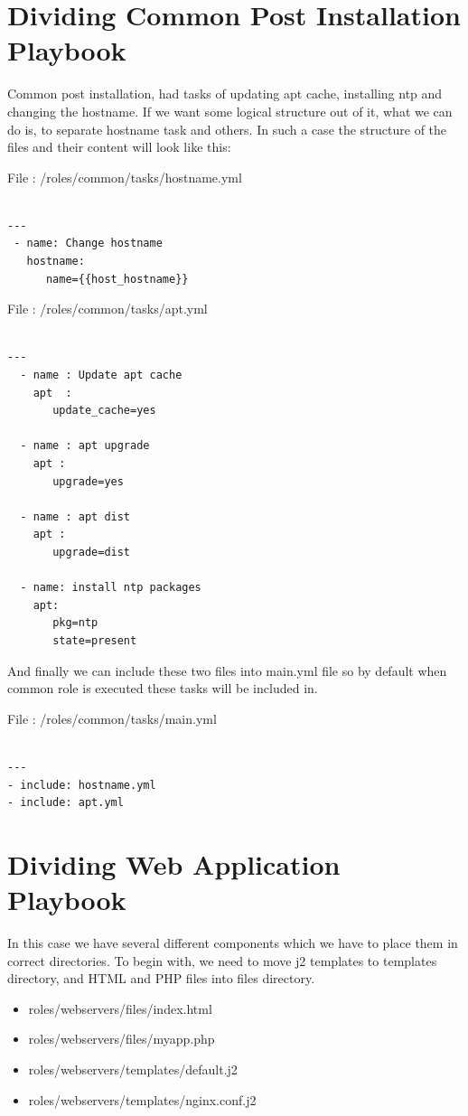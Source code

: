 \documentclass[10pt]{book}
\begin{document}
\section{Dividing Common Post Installation Playbook}
 Common post installation, had tasks of updating apt cache, installing ntp and 
 changing the hostname. If we want some logical structure out of it, what we can 
 do is, to separate hostname task and others. In such a case the structure of 
 the files and their content will look like this:
 
File : /roles/common/tasks/hostname.yml
\begin{Verbatim} 
 
---
 - name: Change hostname
   hostname: 
      name={{host_hostname}}

\end{Verbatim}


File : /roles/common/tasks/apt.yml
\begin{Verbatim} 
 
---
  - name : Update apt cache
    apt  : 
       update_cache=yes

  - name : apt upgrade
    apt : 
       upgrade=yes

  - name : apt dist
    apt : 
       upgrade=dist

  - name: install ntp packages
    apt:
       pkg=ntp 
       state=present

\end{Verbatim}  

And finally we can include these two files into main.yml file so by default when 
common role is executed these tasks will be included in.

File : /roles/common/tasks/main.yml
\begin{Verbatim} 
 
---
- include: hostname.yml
- include: apt.yml

\end{Verbatim}  


\section{Dividing Web Application Playbook}
In this case we have several different components which we have to place them in 
correct directories. To begin with, we need to move j2 templates to templates 
directory, and HTML and PHP files into files directory.

\begin{itemize}
\item roles/webservers/files/index.html
\item roles/webservers/files/myapp.php
\item roles/webservers/templates/default.j2
\item roles/webservers/templates/nginx.conf.j2
\end{itemize}
\end{document}
